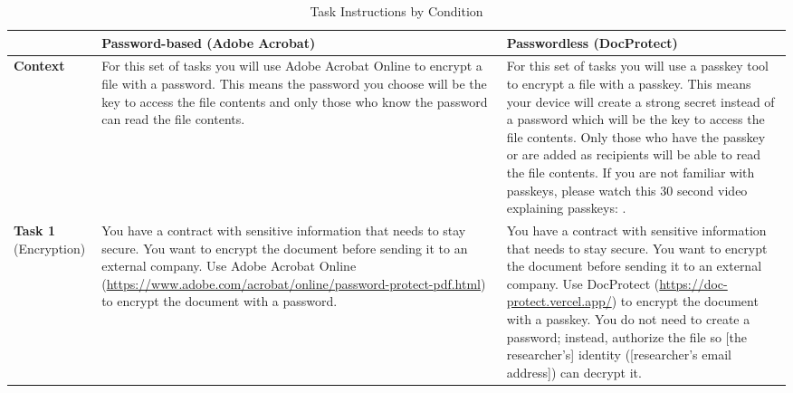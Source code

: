 ﻿%
\begin{table}[H]
    \centering
    \renewcommand{\arraystretch}{1.05}
    \caption{Task Instructions by Condition}
    \label{tab:task-instructions}
    \footnotesize
    \begin{adjustbox}{max width=\textwidth,max height=0.94\textheight,center}
    \begin{tabularx}{\textwidth}{
        >{\raggedright\arraybackslash}p{1.55cm} %
        >{\raggedright\arraybackslash}X        %
        >{\raggedright\arraybackslash}X        %
    }
        \toprule
        & \textbf{Password-based (Adobe Acrobat)} & \textbf{Passwordless (DocProtect)} \\
        \midrule
        
        \textbf{Context} & 
        For this set of tasks you will use Adobe Acrobat Online to encrypt a file with a password. This means the password you choose will be the key to access the file contents and only those who know the password can read the file contents. & 
        For this set of tasks you will use a passkey tool to encrypt a file with a passkey. This means your device will create a strong secret instead of a password which will be the key to access the file contents. Only those who have the passkey or are added as recipients will be able to read the file contents. If you are not familiar with passkeys, please watch this 30 second video explaining passkeys: . \\
        
        \midrule
        
        \textbf{Task 1} \newline (Encryption) & 
        You have a contract with sensitive information that needs to stay secure. You want to encrypt the document before sending it to an external company. Use Adobe Acrobat Online (\url{https://www.adobe.com/acrobat/online/password-protect-pdf.html}) to encrypt the document with a password. & 
        You have a contract with sensitive information that needs to stay secure. You want to encrypt the document before sending it to an external company. Use DocProtect (\url{https://doc-protect.vercel.app/}) to encrypt the document with a passkey. You do not need to create a password; instead, authorize the file so [the researcher's] identity ([researcher's email address]) can decrypt it. \\
        

\end{tabularx}
\end{adjustbox}
\end{table}
